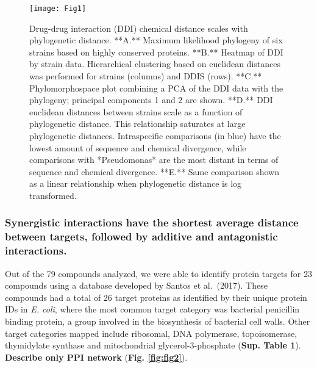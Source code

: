 \documentclass[
]{article}
\begin{document}
\begin{figure}
\texttt{[image: Fig1]} \caption{Drug-drug interaction (DDI) chemical distance scales with phylogenetic distance. **A.** Maximum likelihood phylogeny of six strains based on highly conserved proteins. **B.** Heatmap of DDI by strain data. Hierarchical clustering based on euclidean distances was performed for strains (columns) and DDIS (rows). **C.** Phylomorphospace plot combining a PCA of the DDI data with the phylogeny; principal components 1 and 2 are shown.  **D.** DDI euclidean distances between strains scale as a function of phylogenetic distance. This relationship saturates at large phylogenetic distances. Intraspecific comparisons (in blue) have the lowest amount of sequence and chemical divergence, while comparisons with *Pseudomonas* are the most distant in terms of sequence and chemical divergence. **E.** Same comparison shown as a linear relationship when phylogenetic distance is log transformed.}\label{fig:fig1}
\end{figure}

\hypertarget{synergistic-interactions-have-the-shortest-average-distance-between-targets-followed-by-additive-and-antagonistic-interactions.}{%
\subsubsection{Synergistic interactions have the shortest average distance between targets, followed by additive and antagonistic interactions.}\label{synergistic-interactions-have-the-shortest-average-distance-between-targets-followed-by-additive-and-antagonistic-interactions.}}

Out of the 79 compounds analyzed, we were able to identify protein targets for 23 compounds using a database developed by Santos et al.~(2017). These compounds had a total of 26 target proteins as identified by their unique protein IDs in \emph{E. coli}, where the most common target category was bacterial penicillin binding protein, a group involved in the biosynthesis of bacterial cell walls. Other target categories mapped include ribosomal, DNA polymerase, topoisomerase, thymidylate synthase and mitochondrial glycerol-3-phosphate (\textbf{Sup. Table 1}). \textbf{Describe only PPI network} (\textbf{Fig. \ref{fig:fig2}}).
\end{document}
